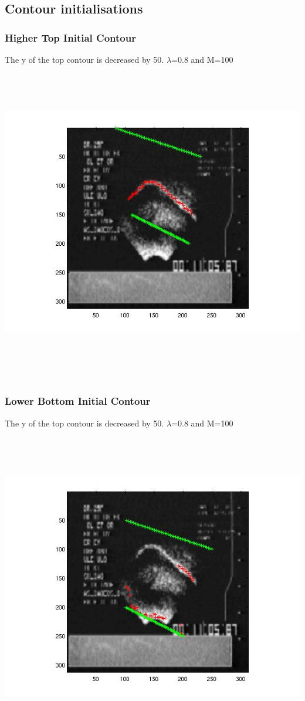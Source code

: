 \documentclass[12pt,a4paper,twocolumn]{article}
\begin{document}
\subsection{Contour initialisations}
\subsubsection{Higher Top Initial Contour}
The y of the top contour is decreased by 50.
$\lambda$=0.8 and M=100
\includegraphics[width=500pt,height=400pt,scale=1]{top_plus_many.jpg}
\newpage
\mbox{}
\newpage
\mbox{}
\subsubsection{Lower Bottom Initial Contour}
The y of the top contour is decreased by 50.
$\lambda$=0.8 and M=100
\includegraphics[width=500pt,height=400pt,scale=1]{bot_plus_50.jpg}	
\end{document}
